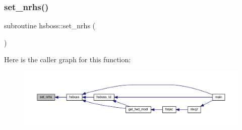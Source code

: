 \subsubsection{\texorpdfstring{set\+\_\+nrhs()}{set\_nrhs()}}
{\footnotesize\ttfamily subroutine hsboss\+::set\+\_\+nrhs (\begin{DoxyParamCaption}{ }\end{DoxyParamCaption})}

Here is the caller graph for this function\+:\nopagebreak
\begin{figure}[H]
\begin{center}
\leavevmode
\includegraphics[width=350pt]{Leroi_8f90_a5e91ef1c525aed4231141372759cca43_icgraph}
\end{center}
\end{figure}
\mbox{\label{Leroi_8f90_a25dab6f0be9119c8c046915473136d9c}} 
